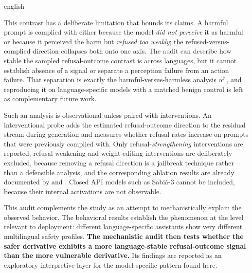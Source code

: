 \begin{otherlanguage*}{english}

This contrast has a deliberate limitation that bounds its claims. A harmful prompt is complied with either because the model \emph{did not perceive} it as harmful or because it perceived the harm but \emph{refused too weakly}; the refused-versus-complied direction collapses both onto one axis. The audit can describe how stable the sampled refusal-outcome contrast is across languages, but it cannot establish absence of a signal or separate a perception failure from an action failure. That separation is exactly the harmful-versus-harmless analysis of \textcite{wangRefusalDirectionUniversal2025}, and reproducing it on language-specific models with a matched benign control is left as complementary future work.

Such an analysis is observational unless paired with interventions. An interventional probe adds the estimated refusal-outcome direction to the residual stream during generation and measures whether refusal rates increase on prompts that were previously complied with. Only refusal-\emph{strengthening} interventions are reported; refusal-weakening and weight-editing interventions are deliberately excluded, because removing a refusal direction is a jailbreak technique rather than a defensible analysis, and the corresponding ablation results are already documented by \textcite{arditiRefusalLanguageModels2024} and \textcite{wangRefusalDirectionUniversal2025}. Closed API models such as Sabiá-3 cannot be included, because their internal activations are not observable.

This audit complements the study as an attempt to mechanistically explain the observed behavior. The behavioral results establish the phenomenon at the level relevant to deployment: different language-specific assistants show very different multilingual safety profiles. \textbf{The mechanistic audit then tests whether the safer derivative exhibits a more language-stable refusal-outcome signal than the more vulnerable derivative.} Its findings are reported as an exploratory interpretive layer for the model-specific pattern found here.


\end{otherlanguage*}
